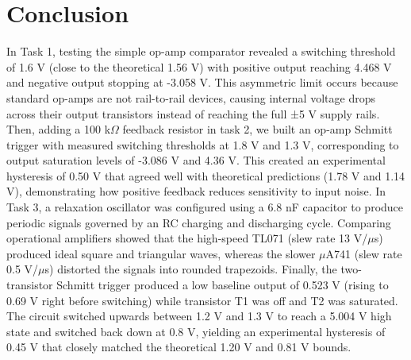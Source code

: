\documentclass[12pt]{article}
\begin{document}
\section{Conclusion}
In Task 1, testing the simple op-amp comparator revealed a switching threshold 
of 1.6 V (close to the theoretical 1.56 V) with positive output reaching 
4.468 V and negative output stopping at -3.058 V. This asymmetric limit occurs because 
standard op-amps are not rail-to-rail devices, causing internal voltage drops across their 
output transistors instead of reaching the full ±5 V supply rails.\newline
Then, adding a 100 k$\Omega$ feedback resistor in task 2, we built an op-amp Schmitt 
trigger with measured switching thresholds at 1.8 V and 1.3 V, corresponding to output 
saturation levels of -3.086 V and 4.36 V. This created an experimental hysteresis of 0.50 V 
that agreed well with theoretical predictions (1.78 V and 1.14 V), demonstrating how positive 
feedback reduces sensitivity to input noise.\newline
In Task 3, a relaxation oscillator was configured using a 6.8 nF capacitor to produce periodic 
signals governed by an RC charging and discharging cycle. Comparing operational amplifiers 
showed that the high-speed TL071 (slew rate 13 V/$\mu$s) produced ideal square and triangular 
waves, whereas the slower $\mu$A741 (slew rate 0.5 V/$\mu$s) distorted the signals into rounded trapezoids.\newline
Finally, the two-transistor Schmitt trigger produced a low baseline output of 
0.523 V (rising to 0.69 V right before switching) while transistor T1 was off and T2 
was saturated. The circuit switched upwards between 1.2 V and 1.3 V to reach a 5.004 V high 
state and switched back down at 0.8 V, yielding an experimental hysteresis of 0.45 V that closely 
matched the theoretical 1.20 V and 0.81 V bounds.

\nocite{*}
\printbibliography 
\end{document}
